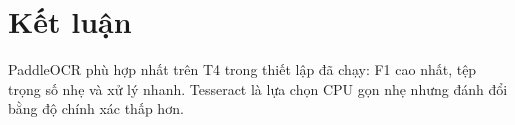 \section{Kết luận}
PaddleOCR phù hợp nhất trên T4 trong thiết lập đã chạy: F1 cao nhất, tệp trọng số
nhẹ và xử lý nhanh. Tesseract là lựa chọn CPU gọn nhẹ nhưng đánh đổi bằng độ
chính xác thấp hơn.
